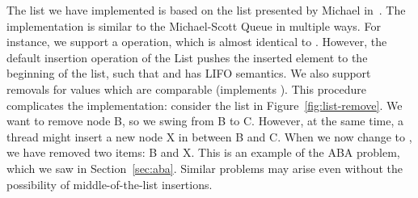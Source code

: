 \documentclass[b5paper]{report}
\begin{document}
The list we have implemented is based on the list presented by Michael
in~\cite{michael2002high}. The implementation is similar to the Michael-Scott
Queue in multiple ways. For instance, we support a 
operation, which is almost identical to . However, the default
insertion operation of the List pushes the inserted element to the beginning of
the list, such that  and  has LIFO
semantics. We also support removals for values which are comparable (implements
). This procedure complicates the implementation: consider the
list in Figure~\ref{fig:list-remove}. We want to remove node B, so we swing
 from B to C. However, at the same time, a thread might insert a
new node X in between B and C. When we now change  to , we
have removed two items: B and X. This is an example of the ABA problem, which we
saw in Section~\ref{sec:aba}. Similar problems may arise even without the
possibility of middle-of-the-list insertions.
\end{document}
